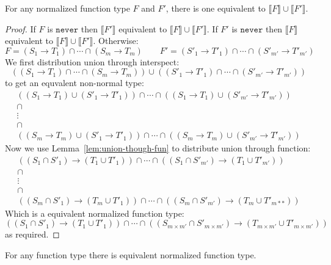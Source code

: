 \documentclass[acmsmall,review,screen]{acmart}
\newcommand{\NEVER}{\mathtt{never}}
\newcommand{\fun}{\mathbin{\rightarrow}}
\newcommand{\sem}[1]{\llbracket{#1}\rrbracket}
\begin{document}
\begin{lemma} \label{lem:funun}
  For any normalized function type $F$ and $F'$,
  there is one equivalent to
  $\sem{F} \cup \sem{F'}$.
\end{lemma}

\begin{proof}
  If $F$ is $\NEVER$ then $\sem{F'}$ equivalent to $\sem{F} \cup \sem{F'}$.
  If $F'$ is $\NEVER$ then $\sem{F}$ equivalent to $\sem{F} \cup \sem{F'}$.
  Otherwise:
  \[
    F = (S_1 \fun T_1) \cap \cdots \cap (S_{m} \fun T_{m})
  \qquad
    F' = (S'_1 \fun T'_1) \cap \cdots \cap (S'_{m'} \fun T'_{m'})
  \]
  We first distribution union through interspect:
  \[
    ((S_1 \fun T_1) \cap \cdots \cap (S_{m} \fun T_{m}))
    \cup
    ((S'_1 \fun T'_1) \cap \cdots \cap (S'_{m'} \fun T'_{m'}))
  \]
  to get an equvalent non-normal type:
  \[\begin{array}{c}
    ((S_{1} \fun T_{1}) \cup (S'_{1} \fun T'_{1}))
    \cap \cdots \cap
    ((S_{1} \fun T_{1}) \cup (S'_{m'} \fun T'_{m'}))
    \\
    \cap
    \\
    \vdots
    \\
    \cap
    \\
    ((S_{m} \fun T_{m}) \cup (S'_{1} \fun T'_{1}))
    \cap \cdots \cap
    ((S_{m} \fun T_{m}) \cup (S'_{m'} \fun T'_{m'}))
  \end{array}\]
  Now we use Lemma~\ref{lem:union-though-fun} to distribute union through function:
  \[\begin{array}{c}
    ((S_{1} \cap S'_{1}) \fun (T_{1} \cup T'_{1}))
    \cap \cdots \cap
    ((S_{1} \cap S'_{m'}) \fun (T_{1} \cup T'_{m'}))
    \\
    \cap
    \\
    \vdots
    \\
    \cap
    \\
    ((S_{m} \cap S'_{1}) \fun (T_{m} \cup T'_{1}))
    \cap \cdots \cap
    ((S_{m} \cap S'_{m'}) \fun (T_{m} \cup T'_{m**}))
  \end{array}\]
  Which is a equivalent normalized function type:
  \[
    ((S_{1} \cap S'_{1}) \fun (T_{1} \cup T'_{1}))
    \cap \cdots \cap
    ((S_{m \times m'} \cap S'_{m \times m'}) \fun (T_{m \times m'} \cup T'_{m \times m'}))
  \]
  as required.
\end{proof}

\begin{lemma}
  For any function type there is equivalent normalized function type.
\end{lemma}
\end{document}
